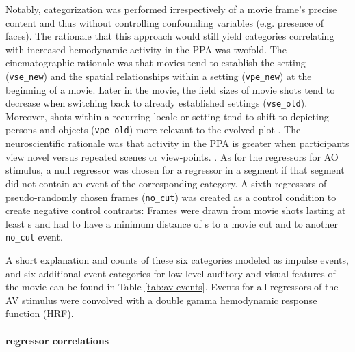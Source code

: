 \documentclass[english]{article}
\begin{document}
Notably, categorization was performed irrespectively of a movie frame's precise
content and thus without controlling confounding variables (e.g. presence of
faces).
The rationale that this approach would still yield categories correlating with
increased hemodynamic activity in the PPA was twofold.
The cinematographic rationale was that movies tend to establish the setting
(\texttt{vse\_new}) and the spatial relationships within a setting
(\texttt{vpe\_new}) at the beginning of a movie.
Later in the movie, the field sizes of movie shots tend to decrease when
switching back to already established settings (\texttt{vse\_old}).
Moreover, shots within a recurring locale or setting tend to shift to depicting
persons and objects (\texttt{vpe\_old}) more relevant to the evolved plot
\citep{brown2012cinematography, mercado2011filmmakers}.
The neuroscientific rationale was that activity in the PPA is greater when
participants view novel versus repeated scenes or view-points.
\citep{epstein1999parahippocampal, grill2006repetition}.
As for the regressors for AO stimulus, a null regressor was chosen for a
regressor in a segment if that segment did not contain an event of the
corresponding category.
A sixth regressors of pseudo-randomly chosen frames (\texttt{no\_cut}) was
created as a control condition to create negative control contrasts:
Frames were drawn from movie shots lasting at least \unit[20]{s} and had to have
a minimum distance of \unit[10]{s} to a movie cut and to another
\texttt{no\_cut} event.


A short explanation and counts of these six categories modeled as impulse
events, and six additional event categories for low-level auditory and visual
features of the movie can be found in Table \ref{tab:av-events}.
Events for all regressors of the AV stimulus were convolved with a
double gamma hemodynamic response function (HRF).


\paragraph{regressor correlations}
\end{document}

